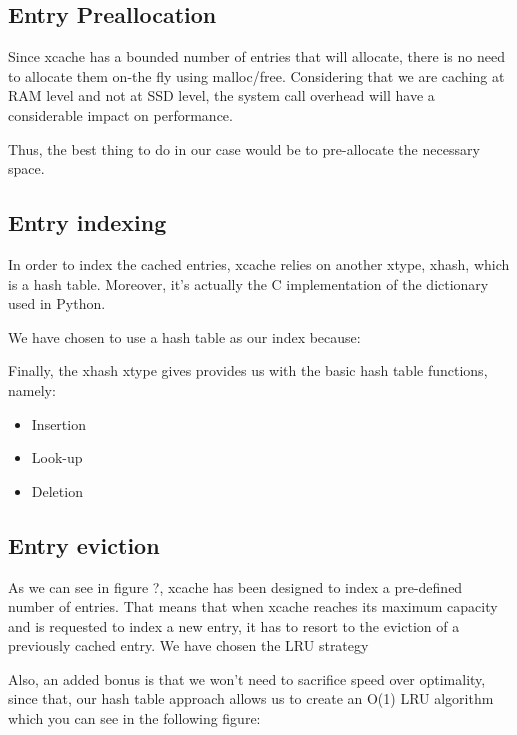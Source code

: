 \subsection{Entry Preallocation}\label{sec:xcache-entry-design}

Since xcache has a bounded number of entries that will allocate, there is no 
need to allocate them on-the fly using malloc/free. Considering that we are 
caching at RAM level and not at SSD level, the system call overhead will have a 
considerable impact on performance.

Thus, the best thing to do in our case would be to pre-allocate the necessary 
space.

\subsection{Entry indexing}\label{sec:xcache-index-design}

In order to index the cached entries, xcache relies on another xtype, xhash, 
which is a hash table. Moreover, it's actually the C implementation of the 
dictionary used in Python.

We have chosen to use a hash table as our index because:

Finally, the xhash xtype gives provides us with the basic hash table functions, 
namely:

\begin{itemize}
	\item Insertion
	\item Look-up
	\item Deletion
\end{itemize}

\subsection{Entry eviction}

As we can see in figure ?, xcache has been designed to index a pre-defined 
number of entries. That means that when xcache reaches its maximum capacity and 
is requested to index a new entry, it has to resort to the eviction of a 
previously cached entry. We have chosen the LRU strategy 

Also, an added bonus is that we won't need to sacrifice speed over optimality, 
since that, our hash table approach allows us to create an O(1) LRU algorithm 
which you can see in the following figure:

